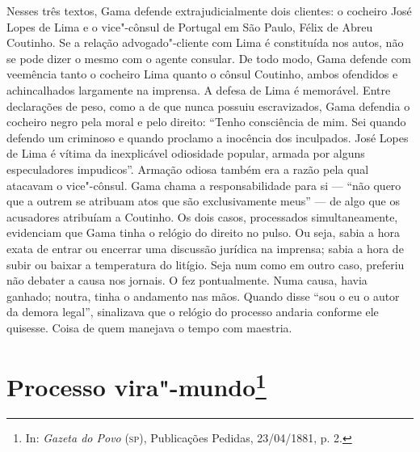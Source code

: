 {\footnotesize\noindent
Nesses três textos, Gama defende extrajudicialmente dois clientes:
o cocheiro José Lopes de Lima e o vice"-cônsul de Portugal em São Paulo,
Félix de Abreu Coutinho. Se a relação advogado"-cliente com Lima é
constituída nos autos, não se pode dizer o mesmo com o agente
consular. De todo modo, Gama defende com veemência tanto o cocheiro Lima
quanto o cônsul Coutinho, ambos ofendidos e achincalhados largamente na
imprensa. A defesa de Lima é memorável. Entre declarações de peso, como
a de que nunca possuiu escravizados, Gama defendia o cocheiro negro pela
moral e pelo direito: ``Tenho consciência de mim. Sei quando defendo um
criminoso e quando proclamo a inocência dos inculpados. José Lopes de
Lima é vítima da inexplicável odiosidade popular, armada por alguns
especuladores impudicos''. Armação odiosa também era a razão pela qual
atacavam o vice"-cônsul. Gama chama a responsabilidade para si --- ``não
quero que a outrem se atribuam atos que são exclusivamente meus'' --- de
algo que os acusadores atribuíam a Coutinho. Os dois casos, processados
simultaneamente, evidenciam que Gama tinha o relógio do direito no
pulso. Ou seja, sabia a hora exata de entrar ou encerrar uma discussão
jurídica na imprensa; sabia a hora de subir ou baixar a temperatura do
litígio. Seja num como em outro caso, preferiu não debater a causa nos
jornais. O fez pontualmente. Numa causa, havia ganhado; noutra, tinha o
andamento nas mãos. Quando disse ``sou o eu o autor da demora legal'',
sinalizava que o relógio do processo andaria conforme ele quisesse.
Coisa de quem manejava o tempo com maestria. }
\@openrighttrue\makeatother \endgroup



\chapter{Processo vira"-mundo\footnote[*]{In: \emph{Gazeta do Povo}
  (\textsc{sp}), Publicações Pedidas, 23/04/1881, p. 2.}}


